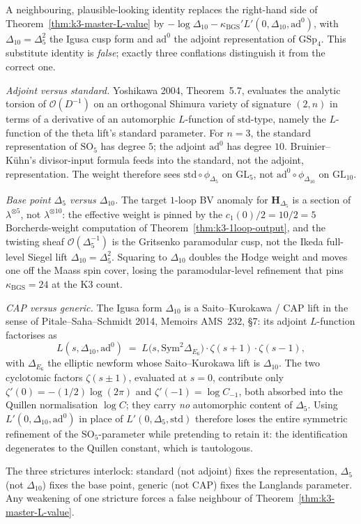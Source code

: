 \begin{remark}
\label{rem:k3-three-conflation-diagnosis}
A neighbouring, plausible-looking identity replaces the right-hand side of
Theorem~\ref{thm:k3-master-L-value} by $-\log \Delta_{10} - \kappa_{\mathrm{BGS}}' L'(0,
\Delta_{10}, \mathrm{ad}^0)$, with $\Delta_{10} = \Delta_5^2$ the Igusa cusp
form and $\mathrm{ad}^0$ the adjoint representation of $\mathrm{GSp}_4$. This
substitute identity is \emph{false}; exactly three conflations distinguish it
from the correct one.

\emph{Adjoint versus standard.} Yoshikawa 2004, Theorem~5.7, evaluates the
analytic torsion of $\mathcal{O}(D^{-1})$ on an orthogonal Shimura variety of
signature $(2,n)$ in terms of a derivative of an automorphic $L$-function of
$\mathrm{std}$-type, namely the $L$-function of the theta lift's standard
parameter. For $n=3$, the standard representation of $\mathrm{SO}_5$ has
degree $5$; the adjoint $\mathrm{ad}^0$ has degree $10$. Bruinier--K\"uhn's
divisor-input formula feeds into the standard, not the adjoint, representation.
The weight therefore sees $\mathrm{std}\circ\phi_{\Delta_5}$ on $\mathrm{GL}_5$,
not $\mathrm{ad}^0\circ\phi_{\Delta_{10}}$ on $\mathrm{GL}_{10}$.

\emph{Base point $\Delta_5$ versus $\Delta_{10}$.} The target $1$-loop BV anomaly for
$\mathbf{H}_{\Delta_5}$ is a section of $\lambda^{\otimes 5}$, not
$\lambda^{\otimes 10}$: the effective weight is pinned by the
$c_1(0)/2=10/2=5$ Borcherds-weight computation of
Theorem~\ref{thm:k3-1loop-output}, and the twisting sheaf
$\mathcal{O}(\Delta_5^{-1})$ is the Gritsenko paramodular cusp, not the Ikeda
full-level Siegel lift $\Delta_{10} = \Delta_5^2$. Squaring to $\Delta_{10}$
doubles the Hodge weight and moves one off the Maass spin cover, losing the
paramodular-level refinement that pins $\kappa_{\mathrm{BGS}} = 24$ at the K3
count.

\emph{CAP versus generic.} The Igusa form $\Delta_{10}$ is a
Saito--Kurokawa / CAP lift in the sense of Pitale--Saha--Schmidt 2014,
Memoirs AMS~232, \S7: its adjoint $L$-function factorises as
\[
 L(s,\Delta_{10},\mathrm{ad}^0)
 \;=\;
 L\bigl(s,\mathrm{Sym}^2 \Delta_{E_6}\bigr)\cdot \zeta(s+1)\cdot \zeta(s-1),
\]
with $\Delta_{E_6}$ the elliptic newform whose Saito--Kurokawa lift is
$\Delta_{10}$. The two cyclotomic factors $\zeta(s\pm 1)$, evaluated at $s=0$,
contribute only $\zeta'(0) = -(1/2)\log(2\pi)$ and $\zeta'(-1) = \log C_{-1}$,
both absorbed into the Quillen normalisation $\log C$; they carry \emph{no}
automorphic content of $\Delta_5$. Using $L'(0,\Delta_{10},\mathrm{ad}^0)$ in
place of $L'(0,\Delta_5,\mathrm{std})$ therefore loses the entire symmetric
refinement of the $\mathrm{SO}_5$-parameter while pretending to retain it: the
identification degenerates to the Quillen constant, which is tautologous.

The three strictures interlock: standard (not adjoint) fixes the representation,
$\Delta_5$ (not $\Delta_{10}$) fixes the base point, generic (not CAP) fixes
the Langlands parameter. Any weakening of one stricture forces a false
neighbour of Theorem~\ref{thm:k3-master-L-value}.
\end{remark}
